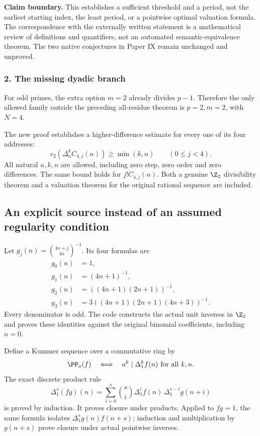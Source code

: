 \textbf{Claim boundary.} This establishes a sufficient threshold and a period, not the earliest starting index, the least period, or a pointwise optimal valuation formula. The correspondence with the externally written statement is a mathematical review of definitions and quantifiers, not an automated semantic-equivalence theorem. The two native conjectures in Paper IX remain unchanged and unproved.

\par\medskip
\subsubsection*{2. The missing dyadic branch}
For odd primes, the extra option $m=2$ already divides $p-1$. Therefore the only allowed family outside the preceding all-residue theorem is $p=2,m=2$, with $N=4$.

The new proof establishes a higher-difference estimate for every one of its four addresses:
\[
\boxed{v_2\!\left(\Delta_u^k C_{4,j}(n)\right)\ge\min(k,n)
       \qquad(0\le j<4).}
\]
All natural $u,k,n$ are allowed, including zero step, zero order and zero differences. The same bound holds for $j!C_{4,j}(n)$. Both a genuine $\Z_2$ divisibility theorem and a valuation theorem for the original rational sequence are included.

\subsection*{An explicit source instead of an assumed regularity condition}
Let $g_j(n)=\binom{4n+j}{4n}^{-1}$. Its four formulas are
\[
\begin{aligned}
 g_0(n)&=1,\\
 g_1(n)&=(4n+1)^{-1},\\
 g_2(n)&=((4n+1)(2n+1))^{-1},\\
 g_3(n)&=3((4n+1)(2n+1)(4n+3))^{-1}.
\end{aligned}
\]
Every denominator is odd. The code constructs the actual unit inverses in $\Z_2$ and proves these identities against the original binomial coefficients, including $n=0$.

Define a Kummer sequence over a commutative ring by
\[
\PP_a(f)\quad\Longleftrightarrow\quad
 a^k\mid\Delta_1^k f(n)\ \text{for all }k,n.
\]
The exact discrete product rule
\[
\Delta_1^s(fg)(n)=\sum_{i=0}^s\binom si
     \Delta_1^i f(n)\,\Delta_1^{s-i}g(n+i)
\]
is proved by induction. It proves closure under products. Applied to $fg=1$, the same formula isolates
$\Delta_1^s g(n)f(n+s)$; induction and multiplication by $g(n+s)$ prove closure under actual pointwise inverses.

